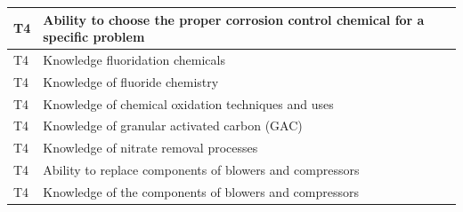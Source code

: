 \begin{table}[H]
\begin{tabular}{| m{1cm} |m{15cm} |}
T4 & Ability to choose the   proper corrosion control chemical for a specific problem           \\ \hline
T4 & Knowledge   fluoridation chemicals                                                         \\ \hline
T4 & Knowledge of fluoride   chemistry                                                          \\ \hline
T4 & Knowledge of chemical   oxidation techniques and uses                                      \\ \hline
T4 & Knowledge of granular   activated carbon (GAC)                                             \\ \hline
T4 & Knowledge of nitrate   removal processes                                                   \\ \hline
T4 & Ability to replace   components of blowers and compressors                                 \\ \hline
T4 & Knowledge of the   components of blowers and compressors                                   \\ \hline
\end{tabular}
\end{table}
\newpage





